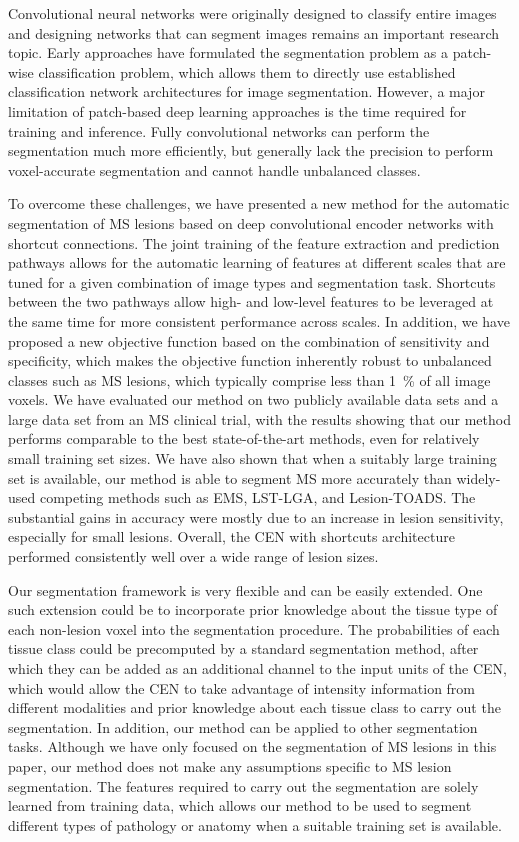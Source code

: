 Convolutional neural networks were originally designed to classify entire images
and designing networks that can segment images remains an important research
topic. Early approaches have formulated the segmentation problem as a patch-wise
classification problem, which allows them to directly use established
classification network architectures for image segmentation.
However, a major limitation of patch-based deep learning approaches is the time
required for training and inference. Fully convolutional networks can perform
the segmentation much more efficiently, but generally lack the precision to
perform voxel-accurate segmentation and cannot handle unbalanced classes.

To overcome these challenges, we have presented a new method for the automatic
segmentation of MS lesions based on deep convolutional encoder networks with
shortcut connections. The joint training of the feature extraction and
prediction pathways allows for the automatic learning of features at different
scales that are tuned for a given combination of image types and segmentation
task. Shortcuts between the two pathways allow high- and low-level features to
be leveraged at the same time for more consistent performance across scales. In
addition, we have proposed a new objective function based on the combination of
sensitivity and specificity, which makes the objective function inherently
robust to unbalanced classes such as MS lesions, which typically comprise less
than \SI{1}{\percent} of all image voxels.
We have evaluated our method on two publicly available data sets and a large
data set from an MS clinical trial, with the results showing that our method
performs comparable to the best state-of-the-art methods, even for relatively
small training set sizes. We have also shown that when a suitably large training
set is available, our method is able to segment MS more accurately than
widely-used competing methods such as EMS, LST-LGA, and Lesion-TOADS. The
substantial gains in accuracy were mostly due to an increase in lesion
sensitivity, especially for small lesions. Overall, the CEN with shortcuts
architecture performed consistently well over a wide range of lesion sizes.

Our segmentation framework is very flexible and can be easily extended. One such
extension could be to incorporate prior knowledge about the tissue type of each
non-lesion voxel into the segmentation procedure. The probabilities of each
tissue class could be precomputed by a standard segmentation method, after which
they can be added as an additional channel to the input units of the CEN, which
would allow the CEN to take advantage of intensity information from different
modalities and prior knowledge about each tissue class to carry out the
segmentation. In addition, our method can be applied to other segmentation
tasks. Although we have only focused on the segmentation of MS lesions in this
paper, our method does not make any assumptions specific to MS lesion
segmentation. The features required to carry out the segmentation are solely
learned from training data, which allows our method to be used to segment
different types of pathology or anatomy when a suitable training set is
available.

